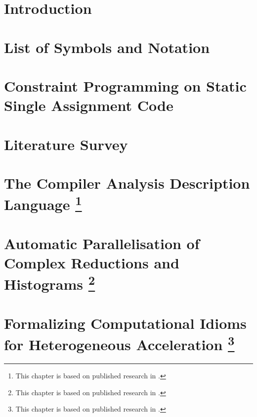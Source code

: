 \documentclass[phd,icsa,twoside,logo,11pt]{infthesis}
\begin{document}
\chapter{Introduction}
    \label{chapter:introduction}
    

\makeatletter
\@openrightfalse
\makeatother
\chapter*{List of Symbols and Notation}
    
\makeatletter
\@openrighttrue
\makeatother

\chapter{Constraint Programming on Static Single Assignment Code}
    \label{chapter:theory}
    

\chapter{Literature Survey}
    \label{chapter:literature}
    

\chapter[Introducing the Compiler Analysis Description Language]
        {The Compiler Analysis Description Language
         \footnote{This chapter is based on published research in
                  \citet{Ginsbach:2018:CDS:3178372.3179515}.}}
    \label{chapter:candl}
    

\chapter[Automatic Parallelisation of Complex Reductions and Histograms]
        {Automatic Parallelisation of Complex Reductions and Histograms
         \footnote{This chapter is based on published research in
                   \citet{ginsbach2017discovery}.}}
    \label{chapter:reductions}
    

\chapter[Formalizing Computational Idioms for Heterogeneous Acceleration]
        {Formalizing Computational Idioms for Heterogeneous Acceleration
         \footnote{This chapter is based on published research in
                   \citet{Ginsbach:2018:AML:3173162.3173182}.}}
    \label{chapter:idioms}
    
\end{document}
